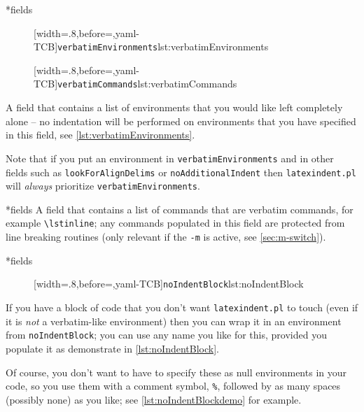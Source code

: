 \documentclass[10pt]{article}
\begin{document}
*{fields} 

\begin{figure}
[width=.8\linewidth,before=\centering,yaml-TCB]{\texttt{verbatimEnvironments}}{lst:verbatimEnvironments}

\vspace{.2cm}
[width=.8\linewidth,before=\centering,yaml-TCB]{\texttt{verbatimCommands}}{lst:verbatimCommands}
\end{figure}
A field that contains a list of environments
that you would like left completely alone -- no indentation will be performed
on environments that you have specified in this field, see \cref{lst:verbatimEnvironments}.

Note that if  you put an environment in \texttt{verbatimEnvironments}
and in other fields such as \texttt{lookForAlignDelims} or \texttt{noAdditionalIndent}
then \texttt{latexindent.pl} will \emph{always} prioritize \texttt{verbatimEnvironments}.

*{fields}
A field that contains a list of commands that are verbatim commands, for example
\lstinline|\lstinline|; any commands populated in this field are protected from line breaking 
routines (only relevant if the \texttt{-m} is active, see \vref{sec:m-switch}).

*{fields} 

\begin{figure}
[width=.8\linewidth,before=\centering,yaml-TCB]{\texttt{noIndentBlock}}{lst:noIndentBlock}
\end{figure}
If you have a block of code that you don't want \texttt{latexindent.pl} to touch (even if it is \emph{not} a verbatim-like
environment) then you can wrap it in an environment from \texttt{noIndentBlock};
you can use any name you like for this, provided you populate it as demonstrate in
\cref{lst:noIndentBlock}.

Of course, you don't want to have to specify these as null environments
in your code, so you use them with a comment symbol, \lstinline!%!, followed
by as many spaces (possibly none) as you like; see \cref{lst:noIndentBlockdemo} for
example.
\end{document}
